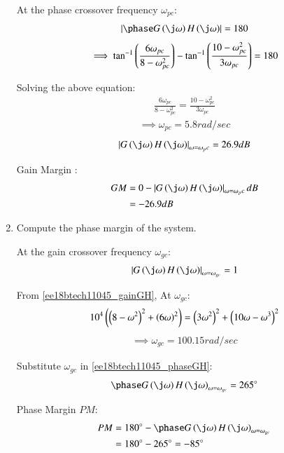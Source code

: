 \begin{enumerate}[label=\thesubsection.\arabic*.,ref=\thesubsection.\theenumi]
At the phase crossover frequency $\omega_{pc}$:
\begin{align}
    \abs{\phase G\brak{\j\omega}H\brak{\j\omega}} = 180
\end{align}
\begin{align}
    \implies \tan^{-1}\left(\frac{6\omega_{pc}}{8 - \omega_{pc}^2}\right) - \tan^{-1}\left(\frac{10-\omega_{pc}^2}{3\omega_{pc}}\right) = 180
\end{align}

Solving the above equation:
\begin{align}
    \frac{6\omega_{pc}}{8 - \omega_{pc}^2} = \frac{10-\omega_{pc}^2}{3\omega_{pc}}
\end{align}
\begin{align}
    \implies \omega_{pc} = 5.8 rad/sec
\end{align}
\begin{align}
    \abs{G\brak{\j\omega}H\brak{\j\omega}}_{\omega=\omega_pc} = 26.9 dB
\end{align}

Gain Margin  :
\begin{align}
    GM &= 0 - \abs{G\brak{\j\omega}H\brak{\j\omega}}_{\omega=\omega_pc} dB
    \\&= -26.9 dB
\end{align}


\item Compute the phase margin of the system.

\solution

At the gain crossover frequency $\omega_{gc}$:
\begin{align}
    \abs{G\brak{\j\omega}H\brak{\j\omega}}_{\omega=\omega_{gc}} = 1
\end{align}

From \eqref{ee18btech11045_gainGH}, At $\omega_{gc}$:
\begin{align}
    10^4\left(\left(8-\omega^2\right)^2 + \left(6\omega\right)^2\right)=
    \left(3\omega^2\right)^2 + \left(10\omega - \omega^3\right)^2
\end{align}
\begin{align}
    \implies \omega_{gc} = 100.15 rad/sec
\end{align}

Substitute $\omega_{gc}$ in \eqref{ee18btech11045_phaseGH}:
\begin{align}
    \phase G\brak{\j\omega}H\brak{\j\omega}_{\omega = \omega_{gc}} = 265\degree
\end{align}

Phase Margin {$PM$}:
\begin{align}
    PM &= 180\degree - \phase G\brak{\j\omega}H\brak{\j\omega}_{\omega = \omega_{gc}}
    \\
    &= 180\degree - 265\degree = - 85\degree
\end{align}



\end{enumerate}
